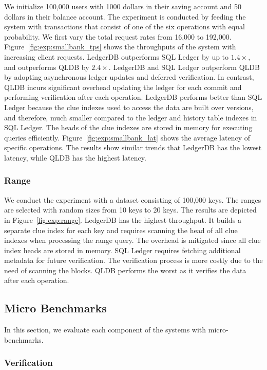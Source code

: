 \documentclass[11pt,dvipdfm]{article}
\begin{document}
We initialize 100,000 users with 1000 dollars in their saving account and 50 dollars in their balance account. The experiment is conducted by feeding the system with transactions that consist of one of the six operations with equal probability. We first vary the total request rates from 16,000 to 192,000. Figure~\ref{fig:exp:smallbank_tps} shows the throughputs of the system with increasing client requests. LedgerDB outperforms SQL Ledger by up to $1.4\times$, and outperforms QLDB by $2.4\times$. LedgerDB and SQL Ledger outperform QLDB by adopting asynchronous ledger updates and deferred verification. In contrast, QLDB incurs significant overhead updating the ledger for each commit and performing verification after each operation. LedgerDB performs better than SQL Ledger because the clue indexes used to access the data are built over versions, and therefore, much smaller compared to the ledger and history table indexes in SQL Ledger. The heads of the clue indexes are stored in memory for executing queries efficiently. Figure~\ref{fig:exp:smallbank_lat} shows the average latency of specific operations. The results show similar trends that LedgerDB has the lowest latency, while QLDB has the highest latency.


\subsubsection{Range}

We conduct the experiment with a dataset consisting of 100,000 keys. 
The ranges are selected with random sizes from 10 keys to 20 keys. The results are depicted in Figure~\ref{fig:exp:range}. LedgerDB has the highest throughput. It builds a separate clue index for each key and requires scanning the head of all clue indexes when processing the range query. The overhead is mitigated since all clue index heads are stored in memory. SQL Ledger requires fetching additional metadata for future verification. The verification process is more costly due to the need of scanning the blocks. QLDB performs the worst as it verifies the data after each operation.


\subsection{Micro Benchmarks}

In this section, we evaluate each component of the systems with micro-benchmarks. 

\subsubsection{Verification}
\end{document}
